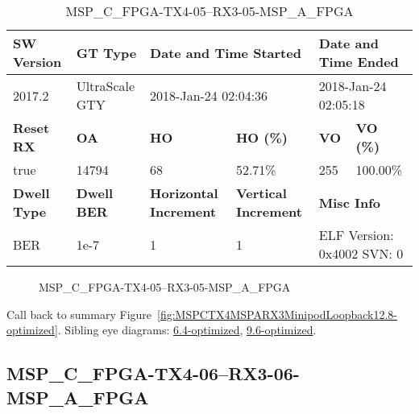 \begin{table}[h]
\centering
\caption{MSP\_C\_FPGA-TX4-05--RX3-05-MSP\_A\_FPGA}
\label{tab:MSPCFPGATX405RX305MSPAFPGA12.8-optimized}
\begin{tabular}{@{}|l|l|l|l|l|l|@{}}
\toprule
\textbf{SW Version}                & \textbf{GT Type}   & \multicolumn{2}{l|}{\textbf{Date and Time Started}}            & \multicolumn{2}{l|}{\textbf{Date and Time Ended}}        \\ \midrule
2017.2                       & UltraScale GTY          & \multicolumn{2}{l|}{2018-Jan-24 02:04:36}                   & \multicolumn{2}{l|}{2018-Jan-24 02:05:18}               \\ \midrule
\textbf{Reset RX}                  & \textbf{OA} & \textbf{HO}   & \textbf{HO (\%)} & \textbf{VO} & \textbf{VO (\%)} \\ \midrule
true & 14794        & 68          & 52.71\%        & 255        & 100.00\%       \\ \midrule
\textbf{Dwell Type}                & \textbf{Dwell BER} & \textbf{Horizontal Increment} & \textbf{Vertical Increment}    & \multicolumn{2}{l|}{\textbf{Misc Info}}                  \\ \midrule
BER                            & 1e-7        & 1        & 1           & \multicolumn{2}{l|}{ELF Version: 0x4002 SVN: 0}                         \\ \bottomrule
\end{tabular}
\end{table}

\begin{figure}[h]
\caption{MSP\_C\_FPGA-TX4-05--RX3-05-MSP\_A\_FPGA} \label{fig:MSPCFPGATX405RX305MSPAFPGA12.8-optimized}
\end{figure}

Call back to summary Figure~\ref{fig:MSPCTX4MSPARX3MinipodLoopback12.8-optimized}.
Sibling eye diagrams: \hyperref[sec:MSPCFPGATX405RX305MSPAFPGA6.4-optimized]{6.4-optimized}, \hyperref[sec:MSPCFPGATX405RX305MSPAFPGA9.6-optimized]{9.6-optimized}.

\clearpage
\newpage


\subsection{MSP\_C\_FPGA-TX4-06--RX3-06-MSP\_A\_FPGA}\label{sec:MSPCFPGATX406RX306MSPAFPGA12.8-optimized}

